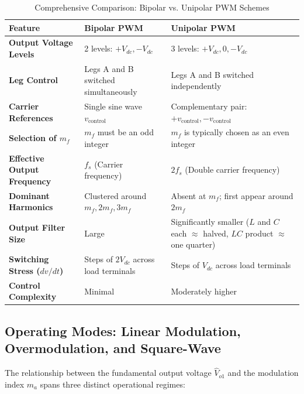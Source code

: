 \documentclass[11pt,a4paper]{article}
\let\origsubsection\subsection
\renewcommand{\subsection}{\Needspace{7\baselineskip}\origsubsection}
\begin{document}
\begin{table}[htbp]
\centering
\small
\caption{Comprehensive Comparison: Bipolar vs. Unipolar PWM Schemes}
\label{tab:bipolar_vs_unipolar}
\begin{tabularx}{\textwidth}{l X X}
\toprule
\textbf{Feature} & \textbf{Bipolar PWM} & \textbf{Unipolar PWM} \\
\midrule
\textbf{Output Voltage Levels} & 2 levels: $+V_{dc}, -V_{dc}$ & 3 levels: $+V_{dc}, 0, -V_{dc}$ \\
\textbf{Leg Control} & Legs A and B switched simultaneously & Legs A and B switched independently \\
\textbf{Carrier References} & Single sine wave $v_{\text{control}}$ & Complementary pair: $+v_{\text{control}}, -v_{\text{control}}$ \\
\textbf{Selection of $m_f$} & $m_f$ must be an odd integer & $m_f$ is typically chosen as an even integer \\
\textbf{Effective Output Frequency} & $f_s$ (Carrier frequency) & $2f_s$ (Double carrier frequency) \\
\textbf{Dominant Harmonics} & Clustered around $m_f, 2m_f, 3m_f$ & Absent at $m_f$; first appear around $2m_f$ \\
\textbf{Output Filter Size} & Large & Significantly smaller ($L$ and $C$ each $\approx$ halved, $LC$ product $\approx$ one quarter) \\
\textbf{Switching Stress ($dv/dt$)} & Steps of $2V_{dc}$ across load terminals & Steps of $V_{dc}$ across load terminals \\
\textbf{Control Complexity} & Minimal & Moderately higher \\
\bottomrule
\end{tabularx}
\end{table}

\subsection{Operating Modes: Linear Modulation, Overmodulation, and Square-Wave}

The relationship between the fundamental output voltage $\hat{V}_{o1}$ and the modulation index $m_a$ spans three distinct operational regimes:
\end{document}

